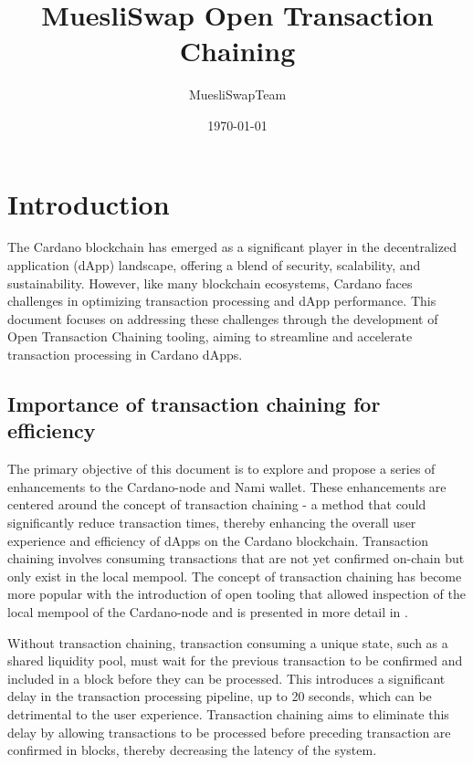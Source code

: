 \documentclass[11pt]{article}
\title{MuesliSwap Open Transaction Chaining}
\author{MuesliSwapTeam}
\date{\today}
\begin{document}
\maketitle

\section{Introduction}

The Cardano blockchain has emerged as a significant player in the decentralized application (dApp) landscape, offering a blend of security, scalability, and sustainability.
However, like many blockchain ecosystems, Cardano faces challenges in optimizing transaction processing and dApp performance.
This document focuses on addressing these challenges through the development of Open Transaction Chaining tooling, aiming to streamline and accelerate transaction processing in Cardano dApps.

\subsection{Importance of transaction chaining for efficiency}

The primary objective of this document is to explore and propose a series of enhancements to the Cardano-node and Nami wallet.
These enhancements are centered around the concept of transaction chaining - a method that could significantly reduce transaction times, thereby enhancing the overall user experience and efficiency of dApps on the Cardano blockchain.
Transaction chaining involves consuming transactions that are not yet confirmed on-chain but only exist in the local mempool.
The concept of transaction chaining has become more popular with the introduction of open tooling that allowed
inspection of the local mempool of the Cardano-node \cite{cardanians2023} and is presented in more detail in \cite{optim2022}.

Without transaction chaining, transaction consuming a unique state, such as a shared liquidity pool,
must wait for the previous transaction to be confirmed and included in a block before they can be processed.
This introduces a significant delay in the transaction processing pipeline, up to 20 seconds, which can be detrimental to the user experience.
Transaction chaining aims to eliminate this delay by allowing transactions to be processed before preceding transaction are confirmed in blocks, thereby decreasing the latency of the system.
\end{document}
